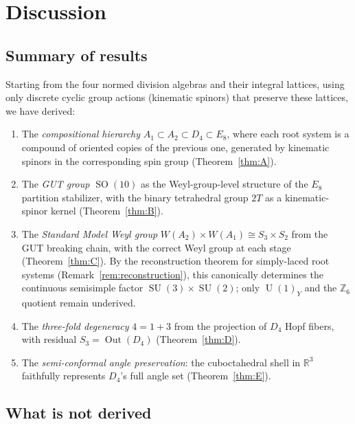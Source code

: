 \documentclass[11pt,reqno]{amsart}
\theoremstyle{plain}
\theoremstyle{definition}
\theoremstyle{remark}
\newcommand{\R}{\mathbb{R}}
\newcommand{\Z}{\mathbb{Z}}
\DeclareMathOperator{\SO}{SO}
\DeclareMathOperator{\SU}{SU}
\DeclareMathOperator{\U}{U}
\DeclareMathOperator{\Out}{Out}
\begin{document}
\section{Discussion}
\label{sec:discussion}

\subsection{Summary of results}

Starting from the four normed division algebras and their
integral lattices, using only discrete cyclic group actions
(kinematic spinors) that preserve these lattices, we have
derived:
\begin{enumerate}
\item The \emph{compositional hierarchy}
  $A_1 \subset A_2 \subset D_4 \subset E_8$,
  where each root system is a compound of oriented copies
  of the previous one, generated by kinematic spinors in
  the corresponding spin group (Theorem~\ref{thm:A}).
\item The \emph{GUT group $\SO(10)$} as the Weyl-group-level
  structure of the $E_8$ partition stabilizer, with the
  binary tetrahedral group $2T$ as a kinematic-spinor kernel
  (Theorem~\ref{thm:B}).
\item The \emph{Standard Model Weyl group}
  $W(A_2) \times W(A_1) \cong S_3 \times S_2$ from the GUT breaking chain,
  with the correct Weyl group at each stage (Theorem~\ref{thm:C}).
  By the reconstruction theorem for simply-laced root systems
  (Remark~\ref{rem:reconstruction}), this canonically determines
  the continuous semisimple factor $\SU(3)\times\SU(2)$;
  only $\U(1)_Y$ and the $\Z_6$ quotient remain underived.
\item The \emph{three-fold degeneracy} $4 = 1 + 3$ from the
  projection of $D_4$ Hopf fibers, with residual $S_3 = \Out(D_4)$
  (Theorem~\ref{thm:D}).
\item The \emph{semi-conformal angle preservation}: the
  cuboctahedral shell in $\R^3$ faithfully represents $D_4$'s
  full angle set (Theorem~\ref{thm:E}).
\end{enumerate}

\subsection{What is not derived}
\end{document}
